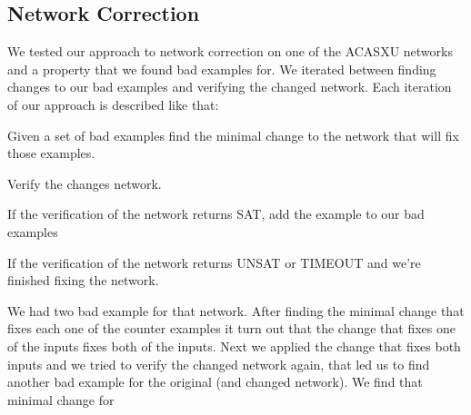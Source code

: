 \documentclass{easychair}
\begin{document}
\subsection{Network Correction}

We tested our approach to network correction on one of the ACASXU networks and a property that we found bad examples for. We iterated between finding changes to our bad examples and verifying the changed network. Each iteration of our approach is described like that:
\begin{list}{•}{}
\item Given a set of bad examples find the minimal change to the network that will fix those examples. 
\item Verify the changes network.
\begin{list}{•}{}
\item If the verification of the network returns SAT, add the example to our bad examples
\item If the verification of the network returns UNSAT or TIMEOUT and we're finished fixing the network.
\end{list}
\end{list}  

We had two bad example for that network. After finding the minimal change that fixes each one of the counter examples it turn out that the change that fixes one of the inputs fixes both of the inputs. Next we applied the change that fixes both inputs and we tried to verify the changed network again, that led us to find another bad example for the original (and changed network). We find that minimal change for
\end{document}
